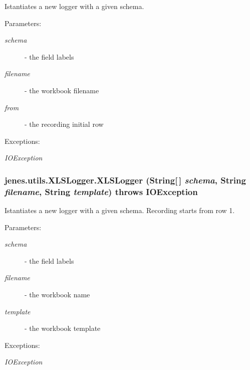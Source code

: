 Istantiates a new logger with a given schema.

\begin{Desc}
\item[Parameters:]
\begin{description}
\item[{\em schema}]- the field labels \item[{\em filename}]- the workbook filename \item[{\em from}]- the recording initial row \end{description}
\end{Desc}
\begin{Desc}
\item[Exceptions:]
\begin{description}
\item[{\em IOException}]\end{description}
\end{Desc}
\hypertarget{classjenes_1_1utils_1_1_x_l_s_logger_2e438a48213dd4e1773c380d7f9d7e4b}{
\subsubsection[XLSLogger]{\setlength{\rightskip}{0pt plus 5cm}jenes.utils.XLSLogger.XLSLogger (String\mbox{[}$\,$\mbox{]} {\em schema}, \/  String {\em filename}, \/  String {\em template})  throws IOException }}
\label{classjenes_1_1utils_1_1_x_l_s_logger_2e438a48213dd4e1773c380d7f9d7e4b}


Istantiates a new logger with a given schema. Recording starts from row 1.

\begin{Desc}
\item[Parameters:]
\begin{description}
\item[{\em schema}]- the field labels \item[{\em filename}]- the workbook name \item[{\em template}]- the workbook template \end{description}
\end{Desc}
\begin{Desc}
\item[Exceptions:]
\begin{description}
\item[{\em IOException}]\end{description}
\end{Desc}


